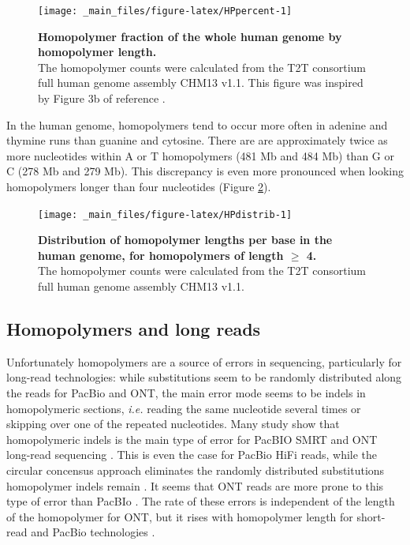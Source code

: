 \documentclass[
  11pt,
  twoside,
  BCOR=10mm,
  listof=totoc]{scrbook}
\begin{document}
\begin{figure}

{\centering \texttt{[image: \_main\_files/figure-latex/HPpercent-1]} 

}

\caption[Homopolymer fraction of the whole human genome by homopolymer length.]{\textbf{Homopolymer fraction of the whole human genome by homopolymer length.}\\The homopolymer counts were calculated from the T2T consortium full human genome assembly CHM13 v1.1. This figure was inspired by Figure 3b of reference \autocite{booeshaghiPseudoalignmentFacilitatesAssignment2022}.}\label{fig:HPpercent}
\end{figure}

In the human genome, homopolymers tend to occur more often in adenine and thymine runs than guanine and cytosine. There are are approximately twice as more nucleotides within A or T homopolymers (481 Mb and 484 Mb) than G or C (278 Mb and 279 Mb). This discrepancy is even more pronounced when looking homopolymers longer than four nucleotides (Figure \ref{fig:HPdistrib}).

\begin{figure}

{\centering \texttt{[image: \_main\_files/figure-latex/HPdistrib-1]} 

}

\caption[Distribution of homopolymer lengths per base in the human genome, for homopolymers of length $\geq$ 4.]{\textbf{Distribution of homopolymer lengths per base in the human genome, for homopolymers of length $\geq$ 4.}\\The homopolymer counts were calculated from the T2T consortium full human genome assembly CHM13 v1.1.}\label{fig:HPdistrib}
\end{figure}

\hypertarget{homopolymers-and-long-reads}{%
\subsection{Homopolymers and long reads}\label{homopolymers-and-long-reads}}

Unfortunately homopolymers are a source of errors in sequencing, particularly for long-read technologies: while substitutions seem to be randomly distributed along the reads for PacBio and ONT, the main error mode seems to be indels in homopolymeric sections, \emph{i.e.} reading the same nucleotide several times or skipping over one of the repeated nucleotides. Many study show that homopolymeric indels is the main type of error for PacBIO SMRT and ONT long-read sequencing \autocite{delahaye2021,goodwin2015,dohmBenchmarkingLongreadCorrection2020,weirather2017}. This is even the case for PacBio HiFi reads, while the circular concensus approach eliminates the randomly distributed substitutions homopolymer indels remain \autocite{wenger2019}. It seems that ONT reads are more prone to this type of error than PacBIo \autocite{logsdonLongreadHumanGenome2020}. The rate of these errors is independent of the length of the homopolymer for ONT, but it rises with homopolymer length for short-read and PacBio technologies \autocite{fooxPerformanceAssessmentDNA2021}.
\end{document}
